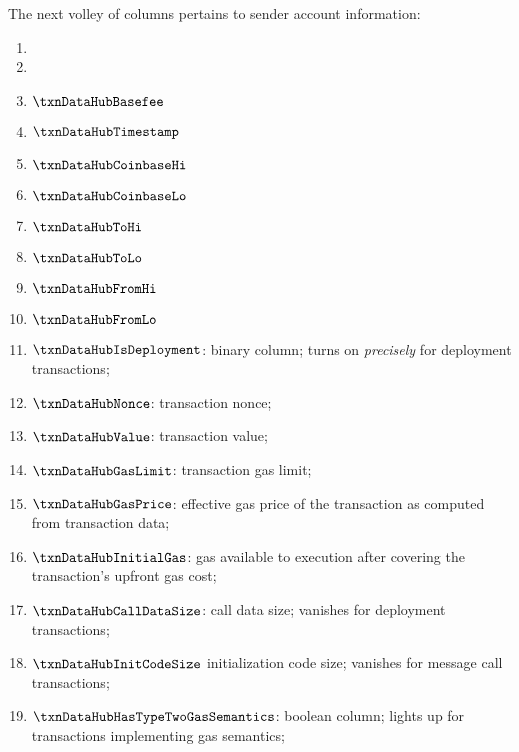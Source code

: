 The next volley of columns pertains to sender account information:
\begin{enumerate}
	\item
		\markAsExtractedFromBtc{}
		\txnDataHubBlockNumber{}
	\item
		\markAsExtractedFromBtc{}
		\txnDataHubBlockGasLimit{}
	\item
		\markAsExtractedFromBtc{}
		$\txnDataHubBasefee$
	\item
		\markAsExtractedFromBtc{}
		$\txnDataHubTimestamp$
	\item
		\markAsExtractedFromBtc{}
		$\txnDataHubCoinbaseHi$
	\item
		\markAsExtractedFromBtc{}
		$\txnDataHubCoinbaseLo$
	\item
		\markAsExtractedFromRlpTxn{}
		\markAsExtractedFromRlpAddr{}
		$\txnDataHubToHi$
	\item
		\markAsExtractedFromRlpTxn{}
		\markAsExtractedFromRlpAddr{}
		$\txnDataHubToLo$
	\item
		\markAsObtainedViaEcrecover{}
		$\txnDataHubFromHi$
	\item
		\markAsObtainedViaEcrecover{}
		$\txnDataHubFromLo$
	\item
		\markAsExtractedFromRlpTxn{}
		$\txnDataHubIsDeployment$:
		binary column;
		turns on \emph{precisely} for deployment transactions;
	\item
		\markAsExtractedFromRlpTxn{}
		$\txnDataHubNonce$:
		transaction nonce;
	\item
		\markAsExtractedFromRlpTxn{}
		$\txnDataHubValue$:
		transaction value;
	\item
		\markAsExtractedFromRlpTxn{}
		$\txnDataHubGasLimit$:
		transaction gas limit;
	\item
		\markAsJustifiedHere{}
		$\txnDataHubGasPrice$:
		effective gas price of the transaction as computed from transaction data;
	\item
		\markAsJustifiedHere{}
		$\txnDataHubInitialGas$:
		gas available to \evm{} execution after covering the transaction's upfront gas cost;
	\item
		\markAsJustifiedHere{}
		$\txnDataHubCallDataSize$:
		call data size;
		vanishes for deployment transactions;
	\item
		\markAsJustifiedHere{}
		$\txnDataHubInitCodeSize$
		initialization code size;
		vanishes for message call transactions;
	\item
		\markAsJustifiedHere{}
		$\txnDataHubHasTypeTwoGasSemantics$:
		boolean column;
		lights up for transactions implementing \cite{EIP-1559} gas semantics;

\end{enumerate}

